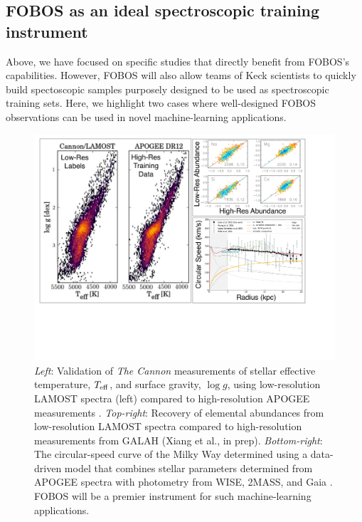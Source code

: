 
\subsection{FOBOS as an ideal spectroscopic training instrument}
\label{sec:datascience}

Above, we have focused on specific studies that directly benefit from
FOBOS's capabilities. However, FOBOS will also allow teams of Keck
scientists to quickly build spectoscopic samples purposely designed
to be used as spectroscopic training sets. Here, we highlight two
cases where well-designed FOBOS observations can be used in novel
machine-learning applications.


\begin{figure}[h!]
\vskip -0.1in
\includegraphics[width=\textwidth]{figs/LGplots.pdf}
\caption{{\it Left}: Validation of {\it The Cannon} measurements of
stellar effective temperature, $T_{\rm eff}$, and surface gravity,
$\log g$, using low-resolution LAMOST spectra (left) compared to
high-resolution APOGEE measurements
\citep[right;][]{2017ApJ...836....5H}. {\it Top-right}: Recovery of
elemental abundances from low-resolution LAMOST spectra compared to
high-resolution measurements from GALAH (Xiang et al., in prep). {\it
Bottom-right}: The circular-speed curve of the Milky Way determined
using a data-driven model that combines stellar parameters determined
from APOGEE spectra with photometry from WISE, 2MASS, and Gaia
\citep{2019ApJ...871..120E}. FOBOS will be a premier instrument for
such machine-learning applications.}
\label{fig:Cannon}
\end{figure}

